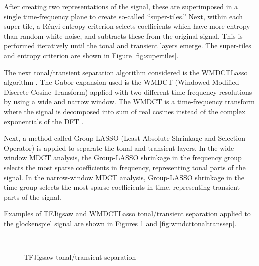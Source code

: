\documentclass[report.tex]{subfiles}
\begin{document}
After creating two representations of the signal, these are superimposed in a single time-frequency plane to create so-called ``super-tiles.'' Next, within each super-tile, a R{\'e}nyi entropy criterion selects coefficients which have more entropy than random white noise, and subtracts these from the original signal. This is performed iteratively until the tonal and transient layers emerge. The super-tiles and entropy criterion are shown in Figure \ref{fig:supertiles}.

The next tonal/transient separation algorithm considered is the WMDCTLasso algorithm \parencite{wmdct}. The Gabor expansion used is the WMDCT (Windowed Modified Discrete Cosine Transform) applied with two different time-frequency resolutions by using a wide and narrow window. The WMDCT is a time-frequency transform where the signal is decomposed into sum of real cosines instead of the complex exponentials of the DFT \parencite{mdct}.

Next, a method called Group-LASSO (Least Absolute Shrinkage and Selection Operator) is applied to separate the tonal and transient layers. In the wide-window MDCT analysis, the Group-LASSO shrinkage in the frequency group selects the most sparse coefficients in frequency, representing tonal parts of the signal. In the narrow-window MDCT analysis,  Group-LASSO shrinkage in the time group selects the most sparse coefficients in time, representing transient parts of the signal.

Examples of TFJigsaw and WMDCTLasso tonal/transient separation applied to the glockenspiel signal are shown in Figures \ref{fig:tfjigsawtonaltranssep} and \ref{fig:wmdcttonaltranssep}.

\begin{figure}[ht]
	\centering
	\\
	\caption{TFJigsaw tonal/transient separation}
	\label{fig:tfjigsawtonaltranssep}
\end{figure}
\end{document}
